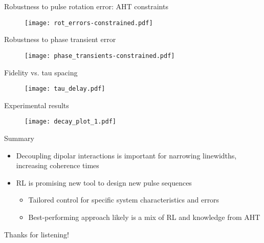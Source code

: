 \documentclass{beamer}
\begin{document}
\begin{frame}
{Robustness to pulse rotation error: AHT constraints}

\begin{figure}
\centering
\texttt{[image: rot\_errors-constrained.pdf]}
\end{figure}

\end{frame}

\begin{frame}{Robustness to phase transient error}

\begin{figure}
\centering
\texttt{[image: phase\_transients-constrained.pdf]}
\end{figure}

\end{frame}

\begin{frame}{Fidelity vs. tau spacing}

\begin{figure}
\centering
\texttt{[image: tau\_delay.pdf]}
\end{figure}

\end{frame}

\begin{frame}{Experimental results}

\begin{figure}
\centering
\texttt{[image: decay\_plot\_1.pdf]}
\end{figure}

\end{frame}

\begin{frame}{Summary}

\begin{itemize}
    \item Decoupling dipolar interactions is important for narrowing linewidths, increasing coherence times
    \item RL is promising new tool to design new pulse sequences
    \begin{itemize}
        \item Tailored control for specific system characteristics and errors
        \item Best-performing approach likely is a mix of RL and knowledge from AHT
    \end{itemize}
\end{itemize}

\pause

\begin{center}
    Thanks for listening!
\end{center}

\end{frame}
\end{document}
